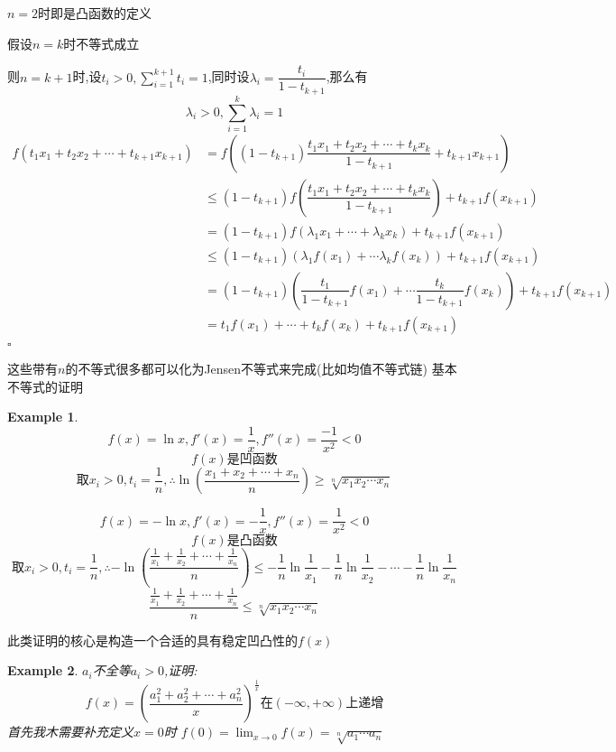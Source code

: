 \documentclass[11pt,hyperref,a4paper,UTF8]{ctexart}
\newtheorem{example}{Example}[subsection]
\newenvironment{cproof}{%
\heiti{证明}\kaishu
}{%
  \hfill $\square$
  \par\bigskip
}
\newcommand{\parameter}[1]{\left(#1\right)}
\begin{document}
\begin{CJK}{UTF8}{gkai}
\begin{cproof}
$n = 2$时即是凸函数的定义

假设$n = k$时不等式成立

则$n = k+1$时,设$t_i > 0 ,\sum_{i = 1} ^ {k + 1} t_i= 1$,同时设$\lambda_i = \dfrac{t_i}{1- t_{k+1}}$,那么有
\[\lambda_i > 0, \sum_{i = 1} ^k \lambda_i = 1\]
\[
\begin{aligned}
f(t_1 x_1 + t_2 x_2 + \cdots + t_{k+1} x_{k+1}) &=f\parameter{(1-t_{k+1})\dfrac{t_1 x_1 + t_2 x_2 + \cdots + t_k x_k}{1-t_{k+1}} + t_{k+1} x_{k+1}}\\
&\leq (1-t_{k+1})f\parameter{\dfrac{t_1 x_1 + t_2 x_2 + \cdots + t_k x_k}{1-t_{k+1}}} + t_{k+1}f(x_{k+1})\\
&=(1-t_{k+1})f(\lambda_1 x_1 + \cdots + \lambda_k x_k) + t_{k+1}f(x_{k+1})\\
&\leq(1-t_{k+1})(\lambda_1 f(x_1) +\cdots \lambda_k f(x_k)) + t_{k+1}f(x_{k+1})\\
&=(1-t_{k+1})\parameter{\dfrac{t_1}{1-t_{k+1}}f(x_1) +\cdots \dfrac{t_k}{1-t_{k+1}}f(x_k)}+ t_{k+1}f(x_{k+1})\\
&=t_1 f(x_1) + \cdots + t_k f(x_k) + t_{k+1} f(x_{k+1})\\
\end{aligned}
\]
\end{cproof}

这些带有$n$的不等式很多都可以化为Jensen不等式来完成(比如均值不等式链)
基本不等式的证明
\begin{example}
\[f(x)= \ln x,f'(x) = \frac{1}{x} , f''(x) = \frac{-1}{x^2} < 0\]
\[f(x)\text{是凹函数}\]
\[\text{取}x_i>0, t_i = \frac{1}{n},\therefore \ln(\frac{x_1 + x_2 +\cdots + x_n}{n})  \geq\sqrt[n]{x_1 x_2 \cdots x_n}\]

\[f(x)=-\ln x,f'(x) = -\frac{1}{x} , f''(x) = \frac{1}{x^2} < 0\]
\[f(x)\text{是凸函数}\]
\[\text{取}x_i>0, t_i = \frac{1}{n},\therefore -\ln(\frac{\frac{1}{x_1} + \frac{1}{x_2} +\cdots + \frac{1}{x_n}}{n})  \leq -\frac{1}{n}\ln\frac{1}{x_1}-\frac{1}{n}\ln\frac{1}{x_2} - \cdots -\frac{1}{n}\ln\frac{1}{x_n}  \]
\[\frac{\frac{1}{x_1} + \frac{1}{x_2} +\cdots + \frac{1}{x_n}}{n} \leq \sqrt[n]{x_1 x_2 \cdots x_n}\]

\end{example}
此类证明的核心是构造一个合适的具有稳定凹凸性的$f(x)$\\

\begin{example}
  $a_i$不全等$a_i > 0$,证明:\\
  \[f(x) = (\dfrac{a_1^2 + a_2^2 +\cdots + a_n^2}{x})^{\frac{1}{x}}\text{在}(-\infty,+\infty)\text{上递增}\]
首先我木需要补充定义$x=0$时 $f(0) = \lim_{x\to 0}f(x) = \sqrt[n]{a_1\cdots a_n}$\\


\end{example}
\end{CJK}
\end{document}
